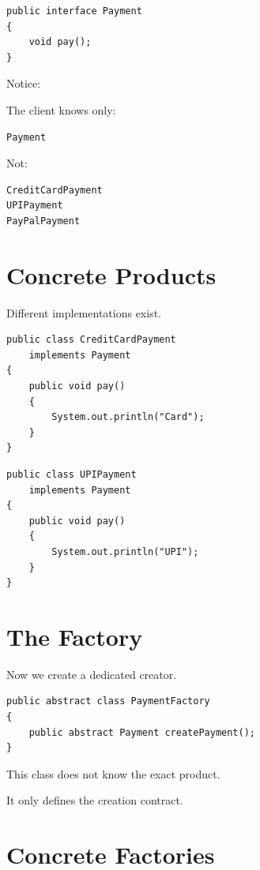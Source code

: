 \documentclass[11pt,a4paper]{book}
\begin{document}
\begin{verbatim}
public interface Payment
{
    void pay();
}
\end{verbatim}

Notice:

The client knows only:

\begin{verbatim}
Payment
\end{verbatim}

Not:

\begin{verbatim}
CreditCardPayment
UPIPayment
PayPalPayment
\end{verbatim}


\section{Concrete Products}

Different implementations exist.

\begin{verbatim}
public class CreditCardPayment
    implements Payment
{
    public void pay()
    {
        System.out.println("Card");
    }
}
\end{verbatim}

\begin{verbatim}
public class UPIPayment
    implements Payment
{
    public void pay()
    {
        System.out.println("UPI");
    }
}
\end{verbatim}


\section{The Factory}

Now we create a dedicated creator.

\begin{verbatim}
public abstract class PaymentFactory
{
    public abstract Payment createPayment();
}
\end{verbatim}

This class does not know the exact product.

It only defines the creation contract.


\section{Concrete Factories}
\end{document}
